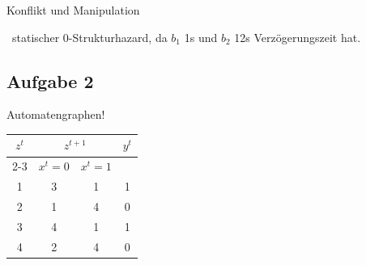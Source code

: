 \documentclass[aspectratio=169,usepdftitle=true,11pt,ngerman,t]{beamer}
\begin{document}
\begin{frame}{Konflikt und Manipulation}
{\begin{solve}
{            \faAngleRight~statischer 0-Strukturhazard, da \(b_1\) 1s und \(b_2\) 12s Verzögerungszeit hat.}
        \end{solve}
    }
\end{frame}

\subsection{Aufgabe 2}
\begin{frame}{Automatengraphen!}
    \begin{exercise}
        \renewcommand{\arraystretch}{1.25}
        \setlength{\tabcolsep}{0.35cm}
        \begin{tabular}{c|cc|c}%
          \(z^t\) & \multicolumn{2}{c|}{\(z^{t+1}\)} & \(y^t\) \\ \cline{2-3}
          & \(x^{t} = 0\) &  \(x^{t} = 1\) &\\  \hline%
          1 & 3 & 1 & 1 \\
          2 & 1 & 4 & 0 \\
          3 & 4 & 1 & 1 \\
          4 & 2 & 4 & 0
        \end{tabular}
    \end{exercise}
\end{frame}
\end{document}
